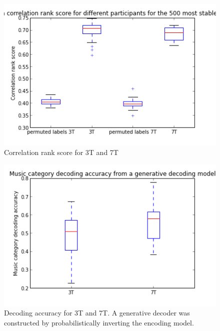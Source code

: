  
 
 
\begin{figure}
	\centering
	\includegraphics[width=\linewidth]{pics/correlation_rank_score}
	\caption{Correlation rank score for 3T and 7T}
	\label{fig:rankscore}
\end{figure}
 
 
 
 
 
\begin{figure}
	\centering
	\includegraphics[width=\linewidth]{pics/decoding_accuracy}
	\caption{Decoding accuracy for 3T and 7T. A generative decoder was constructed by probabilistically inverting the encoding model.}
	\label{fig:decoder}
\end{figure}

